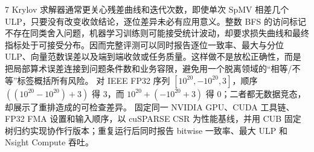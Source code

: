 \begin{solutionexercise}{7}
Krylov 求解器通常更关心残差曲线和迭代次数，即使单次 SpMV 相差几个 ULP，只要没有改变收敛结论，逐位差异未必有应用意义。整数 BFS 的访问标记不存在同类舍入问题，机器学习训练则可能接受统计波动，却要求损失曲线和最终指标处于可接受分布。因而完整评测可以同时报告逐位一致率、最大与分位 ULP、向量范数误差以及端到端收敛或任务质量。这样做不是放松正确性，而是把局部算术误差连接到问题条件数和业务容限，避免用一个脱离领域的“相等/不等”标签概括所有风险。
\variantheading 对 IEEE FP32 序列 $[10^{20},-10^{20},3]$，顺序 $((10^{20}-10^{20})+3)$ 得 3，而 $10^{20}+(-10^{20}+3)$ 得 0；二者都无数据竞态，却展示了重排造成的可检查差异。
\practiceheading 固定同一 NVIDIA GPU、CUDA 工具链、FP32 FMA 设置和输入顺序，以 cuSPARSE CSR 为性能基线，并用 CUB 固定树归约实现协作行版本；重复运行后同时报告 bitwise 一致率、最大 ULP 和 Nsight Compute 吞吐。
\end{solutionexercise}

